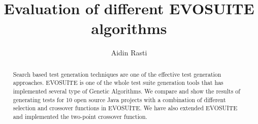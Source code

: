 \documentclass[sigconf]{acmart}
\begin{document}
\title{Evaluation of different EVOSUITE algorithms}

\author{Aidin Rasti}

\renewcommand{\shortauthors}{Aidin}

\begin{abstract}
  Search based test generation techniques are one of the effective test generation approaches. 
  EVOSUITE is one of the whole test suite generation tools that has implemented several 
  type of Genetic Algorithms. We compare and show the results of generating tests for 10 open source 
  Java projects with a combination of different selection and crossover functions in EVOSUITE. 
  We have also extended EVOSUITE and implemented the two-point crossover function.
 

\end{abstract}

\end{document}

